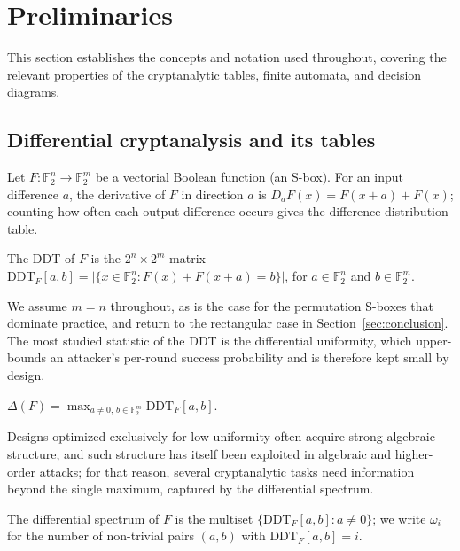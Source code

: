 \documentclass[runningheads]{llncs}
\newcommand{\F}{\mathbb{F}}
\newcommand{\DDT}{\mathrm{DDT}}
\begin{document}
\section{Preliminaries}
\label{sec:prelim}

This section establishes the concepts and notation used throughout, covering the
relevant properties of the cryptanalytic tables, finite automata, and decision
diagrams.

\subsection{Differential cryptanalysis and its tables}

Let $F:\F_2^{n}\to\F_2^{m}$ be a vectorial Boolean function (an S-box). For an
input difference $a$, the derivative of $F$ in direction $a$ is
$D_aF(x)=F(x+a)+F(x)$; counting how often each output difference occurs gives the
difference distribution table.

\begin{definition}
The DDT of $F$ is the $2^{n}\times 2^{m}$ matrix
$\DDT_F[a,b]=\bigl|\{x\in\F_2^{n}:F(x)+F(x+a)=b\}\bigr|$, for $a\in\F_2^{n}$ and
$b\in\F_2^{m}$.
\end{definition}

We assume $m=n$ throughout, as is the case for the permutation S-boxes that
dominate practice, and return to the rectangular case in
Section~\ref{sec:conclusion}. The most studied statistic of the DDT is the
differential uniformity, which upper-bounds an attacker's per-round success
probability and is therefore kept small by design.

\begin{definition}
$\Delta(F)=\max_{a\neq 0,\,b\in\F_2^{m}}\DDT_F[a,b]$.
\end{definition}

Designs optimized exclusively for low uniformity often acquire strong algebraic
structure, and such structure has itself been exploited in algebraic and
higher-order attacks; for that reason, several cryptanalytic tasks need
information beyond the single maximum, captured by the differential spectrum.

\begin{definition}
The differential spectrum of $F$ is the multiset $\{\DDT_F[a,b]:a\neq 0\}$; we
write $\omega_i$ for the number of non-trivial pairs $(a,b)$ with
$\DDT_F[a,b]=i$.
\end{definition}
\end{document}
